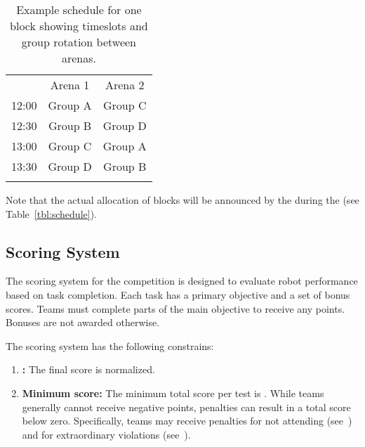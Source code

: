 \begin{table}[h]
\centering
\renewcommand{\arraystretch}{1.4}
\setlength{\tabcolsep}{10pt}
\begin{tabular}{c|c|c|}
\multicolumn{1}{c}{}  & \multicolumn{1}{c}{Arena 1} & \multicolumn{1}{c}{Arena 2} \\
\hhline{~--}
12:00 & \cellcolor{color4}Group A & \cellcolor{color2}Group C \\\hhline{~--}
12:30 & \cellcolor{color3}Group B & \cellcolor{color1}Group D \\\hhline{~--} 
13:00 & \cellcolor{color2}Group C & \cellcolor{color4}Group A \\\hhline{~--} 
13:30 & \cellcolor{color1}Group D & \cellcolor{color3}Group B \\\hhline{~--} 
\end{tabular}
\caption{Example schedule for one block showing timeslots and group rotation between arenas.}\label{tab:schedule_example_times}
\end{table}



\noindent Note that the actual allocation of blocks will be announced by the \OC{} during the \SetupDays{} (see Table~\ref{tbl:schedule}).

\subsection{Scoring System}\label{rule:score_system}

The scoring system for the competition is designed to evaluate robot performance based on task completion. Each task has a primary objective and a set of bonus scores. Teams must complete parts of the main objective to receive any points. Bonuses are not awarded otherwise.

The scoring system has the following constrains:
\begin{enumerate}
	\item \textbf{\FINAL:} The final score is normalized.
	\item \textbf{Minimum score:} The minimum total score per test is .
	While teams generally cannot receive negative points, penalties can result in a total score below zero. Specifically, teams may receive penalties for not attending (see~) and for extraordinary violations (see~).
\end{enumerate}

